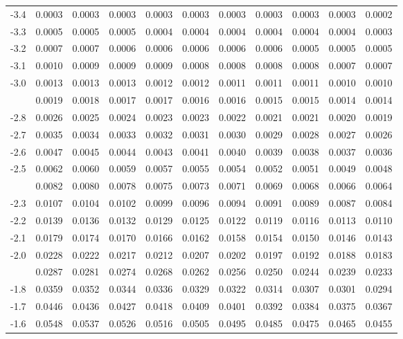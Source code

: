\documentclass[12pt,a4paper]{article}
\begin{document}
\begin{enumerate}
\begin{center}
\begin{longtable}{ccccccccccc}
-3.4 & 0.0003 & 0.0003 & 0.0003 & 0.0003 & 0.0003 & 0.0003 & 0.0003 & 0.0003 & 0.0003 & 0.0002 \\
-3.3 & 0.0005 & 0.0005 & 0.0005 & 0.0004 & 0.0004 & 0.0004 & 0.0004 & 0.0004 & 0.0004 & 0.0003 \\
-3.2 & 0.0007 & 0.0007 & 0.0006 & 0.0006 & 0.0006 & 0.0006 & 0.0006 & 0.0005 & 0.0005 & 0.0005 \\
-3.1 & 0.0010 & 0.0009 & 0.0009 & 0.0009 & 0.0008 & 0.0008 & 0.0008 & 0.0008 & 0.0007 & 0.0007 \\
-3.0 & 0.0013 & 0.0013 & 0.0013 & 0.0012 & 0.0012 & 0.0011 & 0.0011 & 0.0011 & 0.0010 & 0.0010 \\
\addlinespace
-2.9 & 0.0019 & 0.0018 & 0.0017 & 0.0017 & 0.0016 & 0.0016 & 0.0015 & 0.0015 & 0.0014 & 0.0014 \\
-2.8 & 0.0026 & 0.0025 & 0.0024 & 0.0023 & 0.0023 & 0.0022 & 0.0021 & 0.0021 & 0.0020 & 0.0019 \\
-2.7 & 0.0035 & 0.0034 & 0.0033 & 0.0032 & 0.0031 & 0.0030 & 0.0029 & 0.0028 & 0.0027 & 0.0026 \\
-2.6 & 0.0047 & 0.0045 & 0.0044 & 0.0043 & 0.0041 & 0.0040 & 0.0039 & 0.0038 & 0.0037 & 0.0036 \\
-2.5 & 0.0062 & 0.0060 & 0.0059 & 0.0057 & 0.0055 & 0.0054 & 0.0052 & 0.0051 & 0.0049 & 0.0048 \\
\addlinespace
-2.4 & 0.0082 & 0.0080 & 0.0078 & 0.0075 & 0.0073 & 0.0071 & 0.0069 & 0.0068 & 0.0066 & 0.0064 \\
-2.3 & 0.0107 & 0.0104 & 0.0102 & 0.0099 & 0.0096 & 0.0094 & 0.0091 & 0.0089 & 0.0087 & 0.0084 \\
-2.2 & 0.0139 & 0.0136 & 0.0132 & 0.0129 & 0.0125 & 0.0122 & 0.0119 & 0.0116 & 0.0113 & 0.0110 \\
-2.1 & 0.0179 & 0.0174 & 0.0170 & 0.0166 & 0.0162 & 0.0158 & 0.0154 & 0.0150 & 0.0146 & 0.0143 \\
-2.0 & 0.0228 & 0.0222 & 0.0217 & 0.0212 & 0.0207 & 0.0202 & 0.0197 & 0.0192 & 0.0188 & 0.0183 \\
\addlinespace
-1.9 & 0.0287 & 0.0281 & 0.0274 & 0.0268 & 0.0262 & 0.0256 & 0.0250 & 0.0244 & 0.0239 & 0.0233 \\
-1.8 & 0.0359 & 0.0352 & 0.0344 & 0.0336 & 0.0329 & 0.0322 & 0.0314 & 0.0307 & 0.0301 & 0.0294 \\
-1.7 & 0.0446 & 0.0436 & 0.0427 & 0.0418 & 0.0409 & 0.0401 & 0.0392 & 0.0384 & 0.0375 & 0.0367 \\
-1.6 & 0.0548 & 0.0537 & 0.0526 & 0.0516 & 0.0505 & 0.0495 & 0.0485 & 0.0475 & 0.0465 & 0.0455 \\

\end{longtable}
\end{center}
\end{enumerate}
\end{document}
